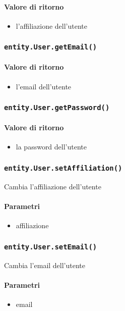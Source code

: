 \paragraph{Valore di ritorno}
\begin{itemize}
\item l'affiliazione dell'utente
\end{itemize}

\subsubsection{\texttt{entity.User.getEmail()}}
\paragraph{Valore di ritorno}
\begin{itemize}
\item l'email dell'utente
\end{itemize}

\subsubsection{\texttt{entity.User.getPassword()}}
\paragraph{Valore di ritorno}
\begin{itemize}
\item la password dell'utente
\end{itemize}

\subsubsection{\texttt{entity.User.setAffiliation()}}
Cambia l'affiliazione dell'utente
\paragraph{Parametri}
\begin{itemize}
\item affiliazione
\end{itemize}

\subsubsection{\texttt{entity.User.setEmail()}}
Cambia l'email dell'utente
\paragraph{Parametri}
\begin{itemize}
\item email
\end{itemize}

